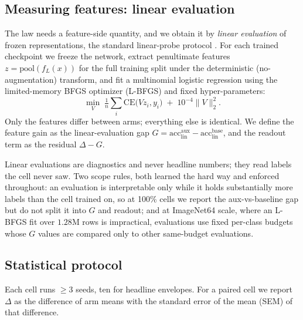 \subsection{Measuring features: linear evaluation}\label{sec:probe}
The law needs a feature-side quantity, and we obtain it by \emph{linear
evaluation} of frozen representations, the standard linear-probe protocol
\citep{alain2016understanding}. For each trained
checkpoint we freeze the network, extract penultimate features
$z = \mathrm{pool}(f_L(x))$ for the full training split under the
deterministic (no-augmentation) transform, and fit a multinomial logistic
regression using the limited-memory BFGS optimizer (L-BFGS) and fixed
hyper-parameters:
\begin{equation}
  \min_{V}\; \tfrac{1}{n}\!\sum_{i} \mathrm{CE}\bigl(Vz_i, y_i\bigr)
    \;+\; 10^{-4}\lVert V\rVert_2^2.
  \label{eq:probe}
\end{equation}
Only the features differ between arms; everything else is identical. We
define the feature gain as the linear-evaluation gap
$G = \mathrm{acc}_{\mathrm{lin}}^{\mathrm{aux}} -
     \mathrm{acc}_{\mathrm{lin}}^{\mathrm{base}}$, and the readout term
as the residual $\Delta - G$.

Linear evaluations are diagnostics and never headline numbers; they read
labels the cell never saw. Two scope rules, both learned the hard way and
enforced throughout: an evaluation is interpretable only while it holds
substantially more labels than the cell trained on, so at 100\% cells we
report the aux-vs-baseline gap but do not split it into $G$ and readout;
and at ImageNet64 scale, where an L-BFGS fit over $1.28$M rows is
impractical, evaluations use fixed per-class budgets whose $G$ values are
compared only to other same-budget evaluations.

\subsection{Statistical protocol}\label{sec:stats}
Each cell runs ${\geq}3$ seeds, ten for headline envelopes. For a paired
cell we report $\Delta$ as the difference of arm means with the standard
error of the mean (SEM) of that difference.

